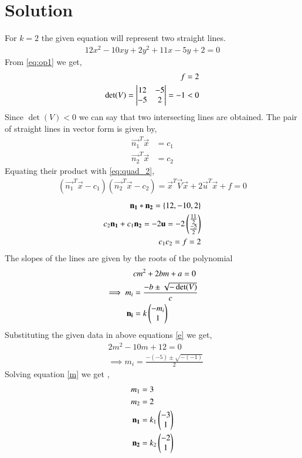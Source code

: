 \documentclass[journal,12pt,twocolumn]{IEEEtran}
\begin{document}
\section{Solution}
For $k = 2$ the given equation will represent two straight lines.
\begin{align}
12x^2-10xy+2y^2+11x-5y+2 = 0 \label{eq:op1}
\end{align}
From \eqref{eq:op1} we get, 
\begin{align}
    f = 2 \label{eq:f_value} \\
    \det(V) = \begin{vmatrix}12 & -5 \\ -5 & 2\end{vmatrix} = -1 < 0 
\end{align}
Since $\det(V)<0$ we can say that two intersecting lines are obtained.
The pair of straight lines in vector form is given by, 
\begin{align}
    \vec{n_1}^T\vec{x}&=c_1\label{m1}\\
    \vec{n_2}^T\vec{x}&=c_2\label{m2}
\end{align}
Equating their product with \eqref{eq:quad_2}, 
\begin{align}
    (\vec{n_1}^T\vec{x}-c_1)(\vec{n_2}^T\vec{x}-c_2)
    = \vec{x}^T\vec{V}\vec{x}+2\vec{u}^T\vec{x}+f=0
\end{align}
\begin{align}
\mathbf{n_1}*\mathbf{n_2}=\{12,-10,2\}\label{conv}\\
c_2\mathbf{n_1}+c_1\mathbf{n_2} = -2\mathbf{u} =  -2\begin{pmatrix}\frac{11}{2}\\ \frac{-5}{2}\end{pmatrix} \label{eqc1c2}\\
c_1c_2 = f = 2
\end{align}
The slopes of the lines are given by the roots of the polynomial 
\begin{align}
    &cm^2+2bm+a=0\label{e}\\
    \implies m_i&=\frac{-b\pm{\sqrt{-\det(V)}}}{c}\\
    \mathbf{n_i}&=k\begin{pmatrix}-m_i\\1\end{pmatrix}
\end{align}
Substituting the given data in above equations \eqref{e} we get,
\begin{align}
    &2m^2 -10m + 12 = 0\\
    &\implies m_i = \frac{-(-5)\pm{\sqrt{-(-1)}}}{2}\label{m}
\end{align}
Solving equation \eqref{m} we get ,
\begin{align}
    m_1&= 3 \\
    m_2&= 2 \\
    \mathbf{n_1}&=k_1\begin{pmatrix}-3 \\ 1\end{pmatrix}\label{n1}\\
    \mathbf{n_2}&=k_2\begin{pmatrix}-2 \\ 1\end{pmatrix}\label{n2}
\end{align}
\end{document}
